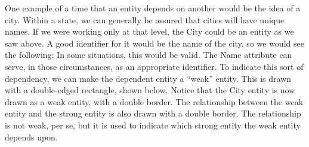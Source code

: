 \documentclass{report}
\begin{document}
\begin{itemize}
\bigbreak \noindent 
One example of a time that an entity depends on another would be the idea of a city. Within a state, we can
generally be assured that cities will have unique names. If we were working only at that level, the City could be an
entity as we saw above. A good identifier for it would be the name of the city, so we would see the following:
\bigbreak \noindent 
{}
\bigbreak \noindent 
In some situations, this would be valid. The Name attribute can serve, in those circumstances, as an appropriate
identifier.
\bigbreak \noindent 
To indicate this sort of dependency, we can make the dependent entity a “weak” entity. This is drawn with a
double-edged rectangle, shown below.
\bigbreak \noindent 
{}
\bigbreak \noindent 
Notice that the City entity is now drawn as a weak entity, with a double border. The relationship between the weak
entity and the strong entity is also drawn with a double border. The relationship is not weak, per se, but it is used to
indicate which strong entity the weak entity depends upon.






    \end{itemize}
\end{document}

